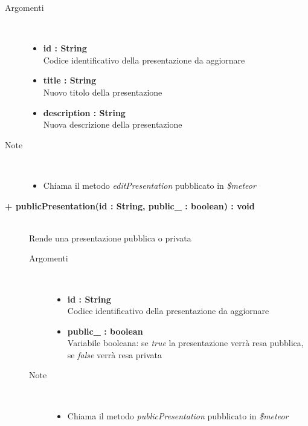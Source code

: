\begin{description}
\begin{description}
		\begin{description}
			\item[Argomenti] \hfill \\
				\begin{itemize}
					\item \textbf{id : String			} \hfill \\
					Codice identificativo della presentazione da aggiornare
					\item \textbf{title : String			} \hfill \\
					Nuovo titolo della presentazione
					\item \textbf{description : String			} \hfill \\
					Nuova descrizione della presentazione
					
				\end{itemize}
			\item[Note] \hfill \\
			\begin{itemize}
					\item Chiama il metodo \textit{editPresentation} pubblicato in \textit{\$meteor}
			\end{itemize}
		\end{description}
	\end{description}


	\begin{description}
		\item[\textbf{\color{blue}+ publicPresentation(id : String, public\_ : boolean) : void			}] \hfill \\
			Rende una presentazione pubblica o privata
			
		\begin{description}
			\item[Argomenti] \hfill \\
				\begin{itemize}
					\item \textbf{id : String			} \hfill \\
					Codice identificativo della presentazione da aggiornare
					\item \textbf{public\_ : boolean			} \hfill \\
					Variabile booleana: se \textit{true} la presentazione verrà resa pubblica, se \textit{false} verrà resa privata
					
				\end{itemize}
			\item[Note] \hfill \\
			\begin{itemize}
					\item Chiama il metodo \textit{publicPresentation} pubblicato in \textit{\$meteor}
			\end{itemize}
		\end{description}
	\end{description}



\end{description}
